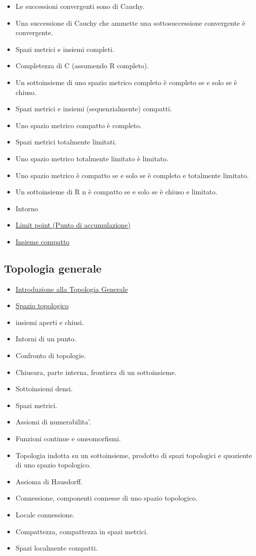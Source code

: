 \documentclass[a4paper,10pt]{article}
\begin{document}
\begin{itemize}
    \item Le successioni convergenti sono di Cauchy. 
    \item Una successione di Cauchy che ammette una sottosuccessione convergente è convergente. 
    \item Spazi metrici e insiemi completi.
    \item Completezza di C (assumendo R completo). 
    \item Un sottoinsieme di uno spazio metrico completo è completo se e solo se è chiuso. 
    \item Spazi metrici e insiemi (sequenzialmente) compatti. 
    \item Uno spazio metrico compatto è completo. 
    \item Spazi metrici totalmente limitati. 
    \item Uno spazio metrico totalmente limitato è limitato. 
    \item Uno spazio metrico è compatto se e solo se è completo e totalmente limitato. 
    \item Un sottoinsieme di R n è compatto se e solo se è chiuso e limitato. 
    \item Intorno
    \item \href{LimitPoint.html}{Limit point (Punto di accumulazione)}
    \item \href{InsiemeCompatto.html}{Insieme compatto}
  \end{itemize}  

  \subsection*{Topologia generale}
    \begin{itemize}
    \item \href{Topologia.html}{Introduzione alla Topologia Generale}
    \item \href{SpazioTopologico.html}{Spazio topologico}
    \item insiemi aperti e chiusi. 
    \item Intorni di un punto. 
    \item Confronto di topologie. 
    \item Chiusura, parte interna, frontiera di un sottoinsieme. 
    \item Sottoinsiemi densi. 
    \item Spazi metrici. 
    \item Assiomi di numerabilita'. 
    \item Funzioni continue e omeomorfismi. 
    \item Topologia indotta su un sottoinsieme, prodotto di spazi topologici e quoziente di uno spazio topologico.  
    \item Assioma di Hausdorff.  
    \item Connessione, componenti connesse di uno spazio topologico. 
    \item Locale connessione. 
    \item Compattezza, compattezza in spazi metrici. 
    \item Spazi localmente compatti. 
    \end{itemize}
  
\end{document}
